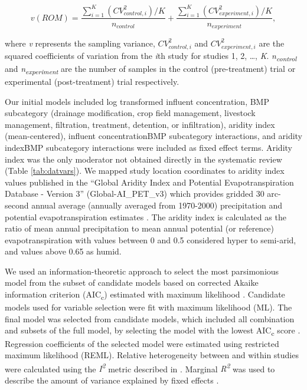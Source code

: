 \documentclass[utf8]{FrontiersinHarvard}
\begin{document}
\[
v(ROM) = \frac{\sum_{i=1}^{K}{(CV^2_{control,i})/K}}{n_{control}} + \frac{\sum_{i=1}^{K}{(CV^2_{experiment,i})/K}}{n_{experiment}},
\]

where \emph{v} represents the sampling variance, \(CV^2_{control,i}\) and \(CV^2_{experiment,i}\) are the squared coefficients of variation from the \emph{i}th study for studies 1, 2, \ldots, \emph{K}. \emph{n\textsubscript{control}} and \emph{n\textsubscript{experiment}} are the number of samples in the control (pre-treatment) trial or experimental (post-treatment) trial respectively.

Our initial models included log transformed influent concentration, BMP subcategory (drainage modification, crop field management, livestock management, filtration, treatment, detention, or infiltration), aridity index (mean-centered), influent concentration\texttimes BMP subcategory interactions, and aridity index\texttimes BMP subcategory interactions were included as fixed effect terms.
Aridity index was the only moderator not obtained directly in the systematic review (Table \ref{tab:datvars}).
We mapped study location coordinates to aridity index values published in the ``Global Aridity Index and Potential Evapotranspiration Database - Version 3'' (Global-AI\_PET\_v3) which provides gridded 30 arc-second annual average (annually averaged from 1970-2000) precipitation and potential evapotranspiration estimates \citep{zomerVersionGlobalAridity2022}.
The aridity index is calculated as the ratio of mean annual precipitation to mean annual potential (or reference) evapotranspiration with values between 0 and 0.5 considered hyper to semi-arid, and values above 0.65 as humid.

We used an information-theoretic approach to select the most parsimonious model from the subset of candidate models based on corrected Akaike information criterion (AIC\textsubscript{c}) estimated with maximum likelihood \citep{cinarUsingInformationTheoretic2021}.
Candidate models used for variable selection were fit with maximum likelihood (ML).
The final model was selected from candidate models, which included all combination and subsets of the full model, by selecting the model with the lowest AIC\textsubscript{c} score \citep{burnhamAICModelSelection2011, cinarUsingInformationTheoretic2021}.
Regression coefficients of the selected model were estimated using restricted maximum likelihood (REML).
Relative heterogeneity between and within studies were calculated using the \emph{I\textsuperscript{2}} metric described in \citet{nakagawaMethodologicalIssuesAdvances2012}.
Marginal \emph{R\textsuperscript{2}} was used to describe the amount of variance explained by fixed effects \citep{nakagawaGeneralSimpleMethod2013}.
\end{document}
